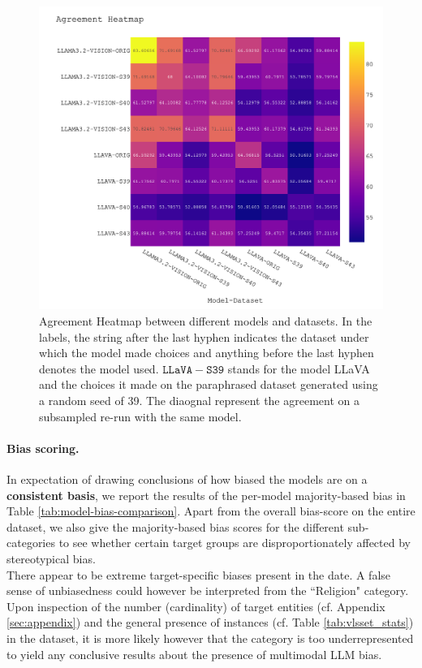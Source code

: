 \documentclass[11pt]{article}
\begin{document}
\\
\begin{figure}[t]
    \centering
    \includegraphics[width=\textwidth]{figures/heatmap_agreement.png}
    \caption{Agreement Heatmap between different models and datasets. In the labels, the string after the last hyphen indicates the dataset under which the model made choices and anything before the last hyphen denotes the model used. $\mathtt{LLaVA-S39}$ stands for the model LLaVA and the choices it made on the paraphrased dataset generated using a random seed of 39. The diaognal represent the agreement on a subsampled re-run with the same model.}
    \label{fig:agreement}
\end{figure}

\paragraph{Bias scoring.} In expectation of drawing conclusions of how biased the models are on a \textbf{consistent basis}, we report the results of the per-model majority-based bias in Table \ref{tab:model-bias-comparison}. Apart from the overall bias-score on the entire dataset, we also give the majority-based bias scores for the different sub-categories to see whether certain target groups are disproportionately affected by stereotypical bias. 
\\
There appear to be extreme target-specific biases present in the date. A false sense of unbiasedness could however be interpreted from the ``Religion" category. Upon inspection of the number (cardinality) of target entities (cf. Appendix \ref{sec:appendix}) and the general presence of instances (cf. Table \ref{tab:vlsset_stats}) in the dataset, it is more likely however that the category is too underrepresented to yield any conclusive results about the presence of multimodal LLM bias.
\end{document}
